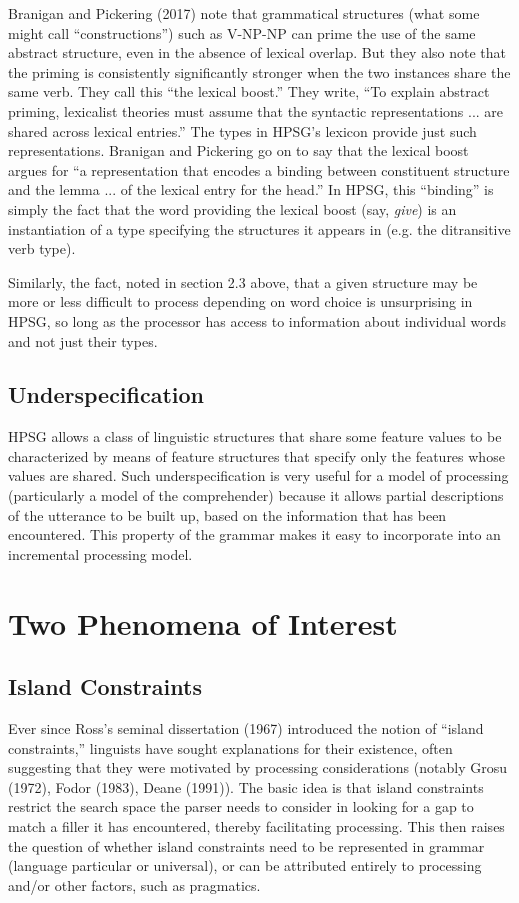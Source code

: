 \documentclass[a4paper]{article}
\begin{document}
Branigan and Pickering (2017) note that grammatical structures (what some might call ``constructions'') such as V-NP-NP can prime the use of the same abstract structure, even in the absence of lexical overlap.  But they also note that the priming is consistently significantly stronger when the two instances share the same verb.  They call this ``the lexical boost.''  They write, ``To explain abstract
priming, lexicalist theories must assume that the syntactic
representations ...
are shared across lexical entries.'' The types in HPSG's lexicon provide just such representations.  Branigan and Pickering go on to say that the lexical boost argues for ``a representation that
encodes a binding between constituent structure and the
lemma ... of the lexical entry for the
head.''  In HPSG, this ``binding'' is simply the fact that the word providing the lexical boost (say, {\it give}) is an instantiation of a type specifying the structures it appears in (e.g. the ditransitive verb type).

Similarly, the fact, noted in section 2.3 above, that a given structure may be more or less difficult to process depending on word choice is unsurprising in HPSG, so long as the processor has access to information about individual words and not just their types.   
\subsection{Underspecification}

HPSG allows a class of linguistic structures that share some feature values to be characterized by means of feature structures that specify only the features whose values are shared.  Such underspecification is very useful for a model of processing (particularly a model of the comprehender) because it allows partial descriptions of the utterance to be built up, based on the information that has been encountered.  This property of the grammar makes it easy to incorporate into an incremental processing model.

\section{Two Phenomena of Interest}
\subsection{Island Constraints}

Ever since Ross's seminal dissertation (1967) introduced the notion of ``island constraints,'' linguists have sought explanations for their existence, often suggesting that they were motivated by processing considerations (notably Grosu (1972), Fodor (1983), Deane (1991)).  The basic idea is that island constraints restrict the search space the parser needs to consider in looking for a gap to match a filler it has encountered, thereby facilitating processing.  This then raises the question of whether island constraints need to be represented in grammar (language particular or universal), or can be attributed entirely to processing and/or other factors, such as pragmatics.
\end{document}
